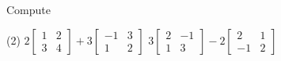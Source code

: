 \begin{exercise}
Compute
\begin{tasks}(2)
\task
$2\begin{bmatrix}
1 & 2 \\
3 & 4
\end{bmatrix}
+
3
\begin{bmatrix}
-1 & 3 \\
1 & 2
\end{bmatrix}$
\task
$3\begin{bmatrix}
2 & -1 \\
1 & 3
\end{bmatrix}
-
2
\begin{bmatrix}
2 & 1 \\
-1 & 2
\end{bmatrix}$
\end{tasks}
\end{exercise}

